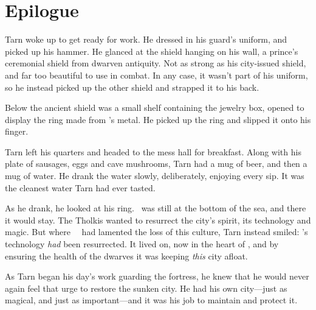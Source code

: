 \chapter*{Epilogue}

Tarn woke up to get ready for work.  He dressed in his guard's uniform, and picked up his hammer.  He glanced at the shield hanging on his wall, a prince's ceremonial shield from dwarven antiquity.  Not as strong as his city-issued shield, and far too beautiful to use in combat.  In any case, it wasn't part of his uniform, so he instead picked up the other shield and strapped it to his back.

Below the ancient shield was a small shelf containing the jewelry box, opened to display the ring made from \kildir's metal.  He picked up the ring and slipped it onto his finger.

Tarn left his quarters and headed to the mess hall for breakfast.  Along with his plate of sausages, eggs and cave mushrooms, Tarn had a mug of beer, and then a mug of water.  He drank the water slowly, deliberately, enjoying every sip.  It was the cleanest water Tarn had ever tasted.

As he drank, he looked at his ring.  \valdunmir\ was still at the bottom of the sea, and there it would stay.  The Tholkis wanted to resurrect the city's spirit, its technology and magic.  But where \mothzam\ \driktur\ had lamented the loss of this culture, Tarn instead smiled: \valdunmir's technology \emph{had} been resurrected.  It lived on, now in the heart of \korbarthrond, and by ensuring the health of the dwarves it was keeping \emph{this} city afloat.

As Tarn began his day's work guarding the fortress, he knew that he would never again feel that urge to restore the sunken city.  He had his own city---just as magical, and just as important---and it was his job to maintain and protect it.